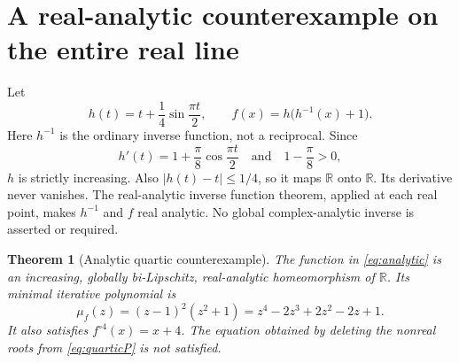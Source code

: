 \documentclass[11pt,letterpaper]{article}
\newtheorem{theorem}{Theorem}[section]
\theoremstyle{definition}
\theoremstyle{remark}
\newcommand{\R}{\mathbb R}
\newcommand{\itn}[2]{#1^{\circ #2}}
\begin{document}
\section{A real-analytic counterexample on the entire real line}
\label{sec:analytic}

Let
\begin{equation}
  h(t)=t+\frac14\sin\frac{\pi t}{2},\qquad
  f(x)=h\bigl(h^{-1}(x)+1\bigr).
  \label{eq:analytic}
\end{equation}
Here $h^{-1}$ is the ordinary inverse function, not a reciprocal.
Since
\begin{equation}
  h'(t)=1+\frac\pi8\cos\frac{\pi t}{2}
  \quad\text{and}\quad
  1-\frac\pi8>0,
\end{equation}
$h$ is strictly increasing. Also $|h(t)-t|\le1/4$, so it maps $\R$ onto
$\R$. Its derivative never vanishes. The real-analytic inverse function
theorem, applied at each real point, makes $h^{-1}$ and $f$ real analytic.
No global complex-analytic inverse is asserted or required.

\begin{theorem}[Analytic quartic counterexample]
\label{thm:quartic}
The function in \eqref{eq:analytic} is an increasing, globally bi-Lipschitz,
real-analytic homeomorphism of $\R$. Its minimal iterative polynomial is
\begin{equation}
  \mu_f(z)=(z-1)^2(z^2+1)
   =z^4-2z^3+2z^2-2z+1.
  \label{eq:quarticP}
\end{equation}
It also satisfies $\itn{f}{4}(x)=x+4$. The equation obtained by deleting the
nonreal roots from \eqref{eq:quarticP} is not satisfied.
\end{theorem}
\end{document}
